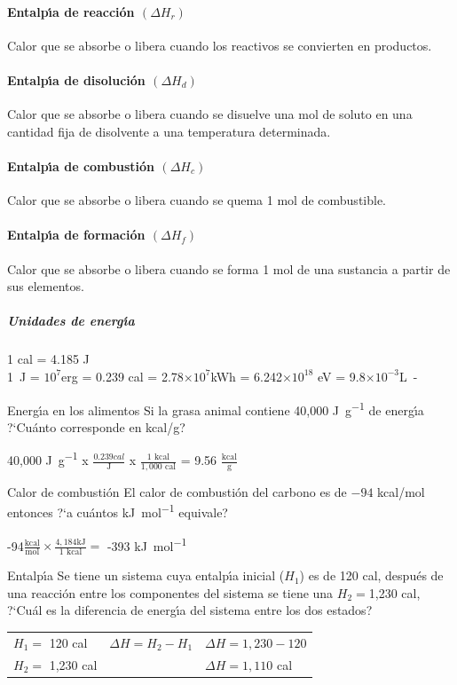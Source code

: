 \paragraph{Entalp\'{\i}a de reacci\'on $(\Delta H_r)$}
Calor que se absorbe o libera cuando los reactivos se convierten en
productos.
\paragraph{Entalp\'{\i}a de disoluci\'on $(\Delta H_d)$}
Calor que se absorbe o libera cuando se di\-suelve una mol de soluto
en una cantidad fija de disolvente a una temperatura determinada.
\paragraph{Entalp\'{\i}a de combusti\'on $(\Delta H_c)$}
Calor que se absorbe o libera cuando se quema 1 mol de combustible.
\paragraph{Entalp\'{\i}a de formaci\'on $(\Delta H_f)$}
Calor que se absorbe o libera cuando se forma 1 mol de una sustancia a
partir de sus elementos.
\subparagraph{Unidades de energ\'{\i}a}

1 cal = 4.185 \si{\joule}\\
{\small \SI{1}{\joule} = $10^7$erg = 0.239 cal = 2.78$\times10^7$kWh =
6.242$\times10^{18}$ eV = 9.8$\times10^{-3}$\si{\liter-\atm}}

\begin{ejemplo}{Energ\'{\i}a en los alimentos}
Si la grasa animal contiene 40,000 \si{\joule\per\gram} de energ\'{\i}a  ?`Cu\'anto corresponde en kcal/g?

 40,000 \si{\joule\per\gram} x  $\frac{0.239 cal}{\si{\joule}}$ x $\frac{1 \textrm{ kcal}}{1,000
\textrm{ cal}}$ = 9.56 $\frac{\textrm{kcal}}{\si{\gram}}$
\end{ejemplo}

\begin{ejemplo}{Calor de combusti\'on}
 El calor de combusti\'on del carbono es de $-94$ {kcal/\si{\mole}} entonces ?`a cu\'an\-tos  \si{\kilo\joule\per\mole} equivale?

\hskip 1in -94$\frac{\textrm{kcal}}{\si{\mole}}\times\frac{4,184 \si{\kilo\joule}}{1  \textrm{ kcal}} =$ -393
\si{\kilo\joule\per\mole}
\end{ejemplo}
\begin{ejemplo}{Entalp\'{\i}a}
Se tiene un sistema cuya entalp\'{\i}a inicial ($H_1$) es de 120 cal, despu\'es de una reacci\'on entre los componentes del sistema se tiene una $H_2=$1,230 cal, ?`Cu\'al es la diferencia de energ\'{\i}a del sistema entre los dos estados? 

\begin{tabular}{lll}
$H_1=$ 120 cal & $\Delta H = H_2 -H_1$ &$\Delta H = 1,230 -120$ \\
$H_2=$ 1,230 cal && $\Delta H = 1,110$ cal
\end{tabular}
\end{ejemplo}

